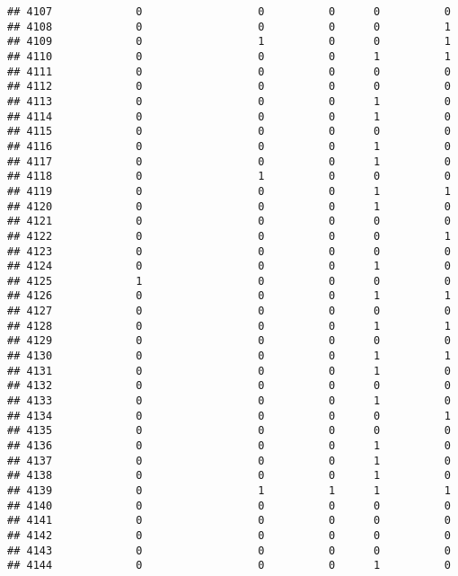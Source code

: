\documentclass[
]{article}
\begin{document}
\begin{verbatim}
## 4107             0                  0          0      0          0
## 4108             0                  0          0      0          1
## 4109             0                  1          0      0          1
## 4110             0                  0          0      1          1
## 4111             0                  0          0      0          0
## 4112             0                  0          0      0          0
## 4113             0                  0          0      1          0
## 4114             0                  0          0      1          0
## 4115             0                  0          0      0          0
## 4116             0                  0          0      1          0
## 4117             0                  0          0      1          0
## 4118             0                  1          0      0          0
## 4119             0                  0          0      1          1
## 4120             0                  0          0      1          0
## 4121             0                  0          0      0          0
## 4122             0                  0          0      0          1
## 4123             0                  0          0      0          0
## 4124             0                  0          0      1          0
## 4125             1                  0          0      0          0
## 4126             0                  0          0      1          1
## 4127             0                  0          0      0          0
## 4128             0                  0          0      1          1
## 4129             0                  0          0      0          0
## 4130             0                  0          0      1          1
## 4131             0                  0          0      1          0
## 4132             0                  0          0      0          0
## 4133             0                  0          0      1          0
## 4134             0                  0          0      0          1
## 4135             0                  0          0      0          0
## 4136             0                  0          0      1          0
## 4137             0                  0          0      1          0
## 4138             0                  0          0      1          0
## 4139             0                  1          1      1          1
## 4140             0                  0          0      0          0
## 4141             0                  0          0      0          0
## 4142             0                  0          0      0          0
## 4143             0                  0          0      0          0
## 4144             0                  0          0      1          0

\end{verbatim}
\end{document}
